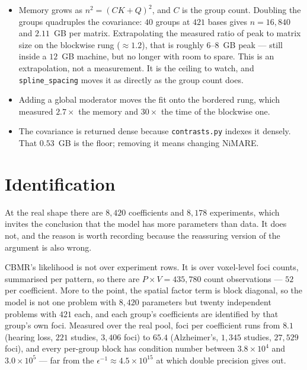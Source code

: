 \documentclass[11pt,a4paper]{article}
\theoremstyle{plain}
\theoremstyle{definition}
\begin{document}
\begin{itemize}
  \item Memory grows as $n^2 = (CK+Q)^2$, and $C$ is the group count. Doubling the groups
        quadruples the covariance: $40$ groups at $421$ bases gives $n = 16{,}840$ and
        $2.11$~GB per matrix. Extrapolating the measured ratio of peak to matrix size on the
        blockwise rung ($\approx\!1.2$), that is roughly $6$--$8$~GB peak --- still inside a
        $12$~GB machine, but no longer with room to spare. This is an extrapolation, not a
        measurement. It is the ceiling to watch, and \texttt{spline\_spacing} moves it as
        directly as the group count does.
  \item Adding a global moderator moves the fit onto the bordered rung, which measured $2.7\times$
        the memory and $30\times$ the time of the blockwise one.
  \item The covariance is returned dense because \texttt{contrasts.py} indexes it densely. That
        $0.53$~GB is the floor; removing it means changing NiMARE.
\end{itemize}

\section{Identification}

At the real shape there are $8{,}420$ coefficients and $8{,}178$ experiments, which invites the
conclusion that the model has more parameters than data. It does not, and the reason is worth
recording because the reassuring version of the argument is also wrong.

CBMR's likelihood is not over experiment rows. It is over voxel-level foci counts, summarised
per pattern, so there are $P \times V = 435{,}780$ count observations --- $52$ per coefficient.
More to the point, the spatial factor term is block diagonal, so the model is not one problem
with $8{,}420$ parameters but twenty independent problems with $421$ each, and each group's
coefficients are identified by that group's own foci. Measured over the real pool, foci per
coefficient runs from $8.1$ (hearing loss, $221$ studies, $3{,}406$ foci) to $65.4$ (Alzheimer's,
$1{,}345$ studies, $27{,}529$ foci), and every per-group block has condition number between
$3.8\times10^{4}$ and $3.0\times10^{5}$ --- far from the $\epsilon^{-1}\approx4.5\times10^{15}$
at which double precision gives out.
\end{document}
